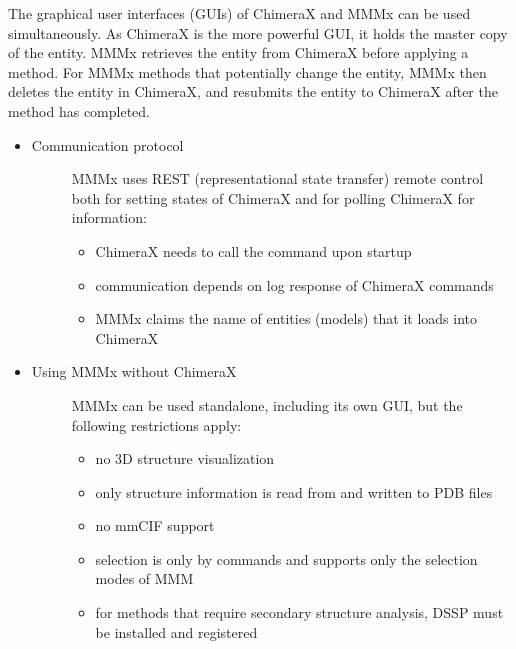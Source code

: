 \documentclass[letterpaper,10pt,english]{sphinxmanual}
\begin{document}
The graphical user interfaces (GUIs) of ChimeraX and MMMx can be used simultaneously.
As ChimeraX is the more powerful GUI, it holds the master copy of the entity. MMMx retrieves the entity from ChimeraX before applying a method.
For MMMx methods that potentially change the entity, MMMx then deletes the entity in ChimeraX, and resubmits the entity to ChimeraX after the method has completed.
\begin{itemize}
\item {} \begin{description}
\item[{Communication protocol}] \leavevmode
MMMx uses REST (representational state transfer) remote control both for setting states of ChimeraX and for polling ChimeraX for information:
\begin{itemize}
\item {} 
ChimeraX needs to call the command  upon startup

\item {} 
communication depends on log response of ChimeraX commands

\item {} 
MMMx claims the name of entities (models) that it loads into ChimeraX

\end{itemize}

\end{description}

\item {} \begin{description}
\item[{Using MMMx without ChimeraX}] \leavevmode
MMMx can be used standalone, including its own GUI, but the following restrictions apply:
\begin{itemize}
\item {} 
no 3D structure visualization

\item {} 
only structure information is read from and written to PDB files

\item {} 
no mmCIF support

\item {} 
selection is only by commands and supports only the selection modes of MMM

\item {} 
for methods that require secondary structure analysis, DSSP must be installed and registered

\end{itemize}

\end{description}

\end{itemize}
\end{document}
